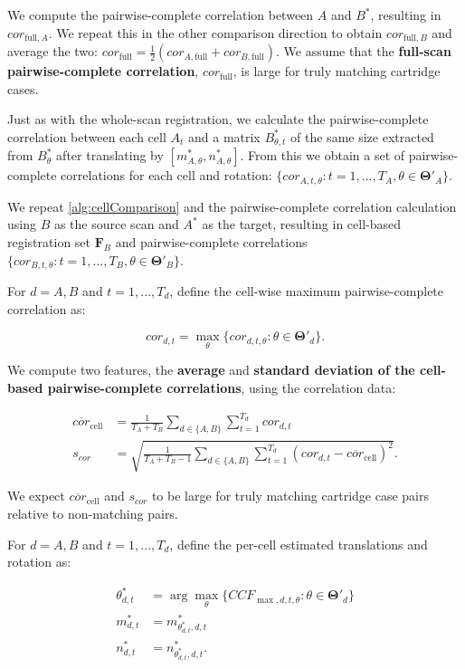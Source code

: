 \documentclass[reprint]{JASA}
\begin{document}
We compute the pairwise-complete correlation between \(A\) and \(B^*\),
resulting in \(cor_{\text{full},A}\). We repeat this in the other
comparison direction to obtain \(cor_{\text{full},B}\) and average the
two:
\(cor_{\text{full}} = \frac{1}{2}\left(cor_{A,\text{full}} + cor_{B,\text{full}}\right)\).
We assume that the \textbf{full-scan pairwise-complete correlation},
\(cor_{\text{full}}\), is large for truly matching cartridge cases.

Just as with the whole-scan registration, we calculate the
pairwise-complete correlation between each cell \(A_t\) and a matrix
\(B_{\theta,t}^*\) of the same size extracted from \(B^*_{\theta}\)
after translating by \([m^*_{A,\theta},n^*_{A,\theta}]\). From this we
obtain a set of pairwise-complete correlations for each cell and
rotation:
\(\{cor_{A,t,\theta} : t = 1,...,T_A, \theta \in \pmb{\Theta}'_A\}\).

We repeat \autoref{alg:cellComparison} and the pairwise-complete
correlation calculation using \(B\) as the source scan and \(A^*\) as
the target, resulting in cell-based registration set \(\pmb{F}_B\) and
pairwise-complete correlations
\(\{cor_{B,t,\theta} : t = 1,...,T_B, \theta \in \pmb{\Theta}'_B\}\).

For \(d = A,B\) and \(t = 1,...,T_d\), define the cell-wise maximum
pairwise-complete correlation as:

\[
cor_{d,t} = \max_{\theta} \{cor_{d,t,\theta} : \theta \in \pmb{\Theta}'_d\}.
\]

We compute two features, the \textbf{average} and \textbf{standard
deviation of the cell-based pairwise-complete correlations}, using the
correlation data:

\begin{align*}
\overline{cor}_{\text{cell}} &= \frac{1}{T_A + T_B} \sum_{d \in \{A,B\}} \sum_{t=1}^{T_d} cor_{d,t} \\
s_{cor} &= \sqrt{\frac{1}{T_A + T_B - 1} \sum_{d \in \{A,B\}} \sum_{t=1}^{T_d} (cor_{d,t} - \overline{cor}_{\text{cell}})^2}.
\end{align*}

We expect \(\overline{cor}_{\text{cell}}\) and \(s_{cor}\) to be large
for truly matching cartridge case pairs relative to non-matching pairs.

For \(d = A,B\) and \(t = 1,...,T_d\), define the per-cell estimated
translations and rotation as:

\begin{align*}
\theta^*_{d,t} &= \arg \max_{\theta} \{CCF_{\max,d,t,\theta} : \theta \in \pmb{\Theta}'_d\} \\
m^*_{d,t} &= m^*_{\theta^*_{d,t},d,t} \\
n^*_{d,t} &= n^*_{\theta^*_{d,t},d,t}.
\end{align*}
\end{document}
